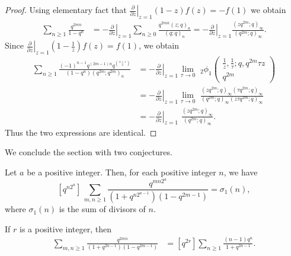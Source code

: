 \documentclass[a4paper,reqno,12pt]{amsart}
\begin{document}
\begin{proof} Using elementary fact that $\left.\frac{\partial}{\partial z}\right|_{z=1}(1-z)f(z)=-f(1)$ we obtain
\begin{align*}
\sum_{n\geq1}\frac{q^{2mn}}{1-q^n} & = -\left.\frac{\partial}{\partial z}\right|_{z=1} \sum_{n\geq0} \frac{q^{2mn}(z;q)_n}{(q;q)_n}
=  -\left.\frac{\partial}{\partial z}\right|_{z=1} \frac{(zq^{2m};q)_{\infty}}{(q^{2m};q)_{\infty}}.
\end{align*}
Since $\left.\frac{\partial}{\partial z}\right|_{z=1}(1-\frac1z)f(z)=f(1)$, we obtain
\begin{align*} \sum_{n\geq1} \frac{(-1)^{n-1}q^{(2m-1)n}q^{\binom{n+1}2}}{(1-q^n)(q^{2m};q^{2m})_n}
&= - \left.\frac{\partial}{\partial z}\right|_{z=1} \lim_{\tau\rightarrow 0} \,\,
{}_2\phi_1 \begin{pmatrix} \frac1z, \frac1{\tau}; q, q^{2m}\tau z   \\ q^{2m} \end{pmatrix}  \\
&= - \left.\frac{\partial}{\partial z}\right|_{z=1} \lim_{\tau\rightarrow 0} \,\,
\frac{(zq^{2m};q)_{\infty}(\tau q^{2m}; q)_{\infty}} {(q^{2m};q)_{\infty} (z\tau q^{2m}; q)_{\infty}}   \\
&= - \left.\frac{\partial}{\partial z}\right|_{z=1} \,\, \frac{(zq^{2m};q)_{\infty}}{(q^{2m};q)_{\infty}}.
\end{align*}
Thus the two expressions are identical.
\end{proof}

We conclude the section with two conjectures.

\begin{conjecture} \label{kick3} Let $a$ be a positive integer. Then, for each positive integer $n$, we have
$$[q^{n2^a}] \, \sum_{m,n\geq1} \frac{q^{mn2^a}}{(1+q^{n2^{a-1}})(1-q^{2m-1})}=\sigma_1(n),$$ where $\sigma_1(n)$ is the sum of divisors of $n$.
\end{conjecture}

\begin{conjecture} \label{kick4} If $r$ is a positive integer, then 
\begin{align*}
[q^{2r}] \sum_{m,n\geq1} \frac{q^{2mn}}{(1+q^{2n-1})(1-q^{2m-1})}&=[q^{2r}] \sum_{n\geq1} \frac{(n-1)q^n}{1+q^{2n-1}}. 
\end{align*} 
\end{conjecture}
\end{document}
